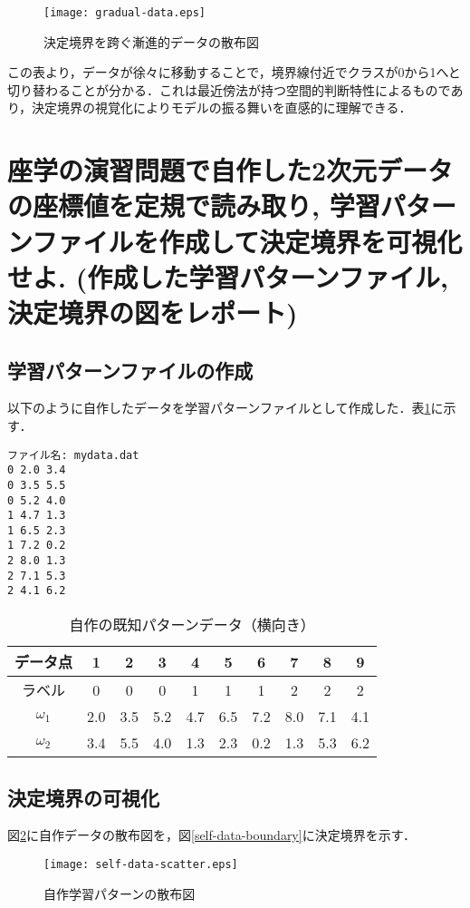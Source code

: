 \documentclass[a4j, 10pt]{jarticle}
\begin{document}
\begin{figure}[H]
  \centering
  \texttt{[image: gradual-data.eps]}
  \caption{決定境界を跨ぐ漸進的データの散布図}\label{gradual-data-plot}
\end{figure}
この表より，データが徐々に移動することで，境界線付近でクラスが0から1へと切り替わることが分かる．これは最近傍法が持つ空間的判断特性によるものであり，決定境界の視覚化によりモデルの振る舞いを直感的に理解できる．

\section{座学の演習問題で自作した2次元データの座標値を定規で読み取り, 学習パターンファイルを作成して決定境界を可視化せよ. (作成した学習パターンファイル, 決定境界の図をレポート)}
\subsection{学習パターンファイルの作成}
以下のように自作したデータを学習パターンファイルとして作成した．表\ref{tab:self-dataset-horizontal}に示す．
\begin{verbatim}
ファイル名: mydata.dat
0 2.0 3.4 
0 3.5 5.5
0 5.2 4.0
1 4.7 1.3
1 6.5 2.3
1 7.2 0.2
2 8.0 1.3
2 7.1 5.3
2 4.1 6.2
\end{verbatim}
\begin{table}[H]
  \centering
  \caption{自作の既知パターンデータ（横向き）}\label{tab:self-dataset-horizontal}
  \begin{tabular}{|c|c|c|c|c|c|c|c|c|c|}
    \hline
    データ点 & 1 & 2 & 3 & 4 & 5 & 6 & 7 & 8 & 9 \\
    \hline
    ラベル & 0 & 0 & 0 & 1 & 1 & 1 & 2 & 2 & 2 \\
    $\omega_1$ & 2.0 & 3.5 & 5.2 & 4.7 & 6.5 & 7.2 & 8.0 & 7.1 & 4.1 \\
    $\omega_2$ & 3.4 & 5.5 & 4.0 & 1.3 & 2.3 & 0.2 & 1.3 & 5.3 & 6.2 \\
    \hline
  \end{tabular}
\end{table}


\subsection{決定境界の可視化}
図\ref{self-data-scatter}に自作データの散布図を，図\ref{self-data-boundary}に決定境界を示す．

\begin{figure}[H]
  \centering
  \texttt{[image: self-data-scatter.eps]}
  \caption{自作学習パターンの散布図}\label{self-data-scatter}
\end{figure}
\end{document}
